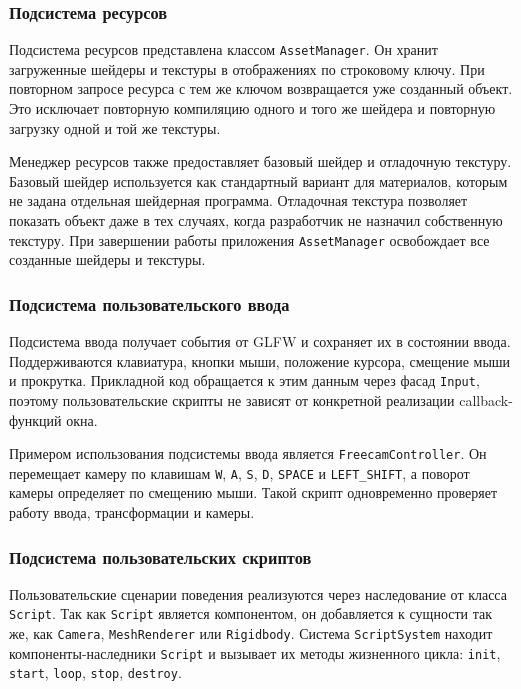 \subsubsection{Подсистема ресурсов}

Подсистема ресурсов представлена классом \texttt{AssetManager}. Он хранит
загруженные шейдеры и текстуры в отображениях по строковому ключу. При повторном
запросе ресурса с тем же ключом возвращается уже созданный объект. Это исключает
повторную компиляцию одного и того же шейдера и повторную загрузку одной и той
же текстуры.

Менеджер ресурсов также предоставляет базовый шейдер и отладочную текстуру.
Базовый шейдер используется как стандартный вариант для материалов, которым
не задана отдельная шейдерная программа. Отладочная текстура позволяет показать
объект даже в тех случаях, когда разработчик не назначил собственную текстуру.
При завершении работы приложения \texttt{AssetManager} освобождает все созданные
шейдеры и текстуры.

\subsubsection{Подсистема пользовательского ввода}

Подсистема ввода получает события от GLFW и сохраняет их в состоянии ввода.
Поддерживаются клавиатура, кнопки мыши, положение курсора, смещение мыши и
прокрутка. Прикладной код обращается к этим данным через фасад \texttt{Input},
поэтому пользовательские скрипты не зависят от конкретной реализации callback-функций
окна.

Примером использования подсистемы ввода является \texttt{FreecamController}.
Он перемещает камеру по клавишам \texttt{W}, \texttt{A}, \texttt{S}, \texttt{D},
\texttt{SPACE} и \texttt{LEFT\_SHIFT}, а поворот камеры определяет по смещению
мыши. Такой скрипт одновременно проверяет работу ввода, трансформации и камеры.

\subsubsection{Подсистема пользовательских скриптов}

Пользовательские сценарии поведения реализуются через наследование от класса
\texttt{Script}. Так как \texttt{Script} является компонентом, он добавляется к
сущности так же, как \texttt{Camera}, \texttt{MeshRenderer} или \texttt{Rigidbody}.
Система \texttt{ScriptSystem} находит компоненты-наследники \texttt{Script} и
вызывает их методы жизненного цикла: \texttt{init}, \texttt{start}, \texttt{loop},
\texttt{stop}, \texttt{destroy}.

